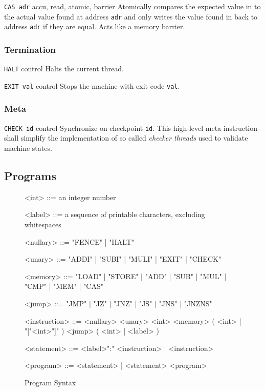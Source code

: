 {\texttt{CAS adr}}
{accu, read, atomic, barrier}
{Atomically compares the expected value in \mem{} to the actual value found at address \texttt{adr} and only writes the value found in \accu{} back to address \texttt{adr} if they are equal.
Acts like a memory barrier.}

\subsubsection{Termination}

{\texttt{HALT}}
{control}
{Halts the current thread.}

{\texttt{EXIT val}}
{control}
{Stops the machine with exit code \texttt{val}.}

\subsubsection{Meta}

{\texttt{CHECK id}}
{control}
{Synchronize on checkpoint \texttt{id}.
This high-level meta instruction shall simplify the implementation of so called \emph{checker threads} used to validate machine states.}

\subsection{Programs}

\begin{figure}[h]
\begin{grammar}

<int> ::= an integer number

<label> ::= a sequence of printable characters, excluding whitespaces

<nullary> ::= "FENCE" | "HALT"

<unary> ::= "ADDI" | "SUBI" | "MULI" | "EXIT" | "CHECK"

<memory> ::= "LOAD" | "STORE" | "ADD" | "SUB" | "MUL" | "CMP" | "MEM" | "CAS"

<jump> ::= "JMP" | "JZ" | "JNZ" | "JS" | "JNS" | "JNZNS"

<instruction> ::= <nullary>
\alt <unary> <int>
\alt <memory> ( <int> | "["<int>"]" )
\alt <jump> ( <int> | <label> )

<statement> ::= <label>":" <instruction> | <instruction>

<program> ::= <statement> | <statement> <program>
\end{grammar}

\caption{Program Syntax}
\label{fig:machine:program}
\end{figure}

